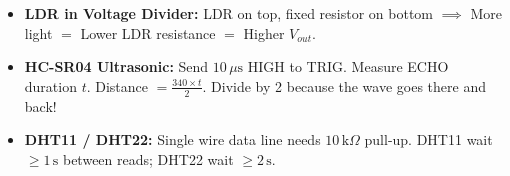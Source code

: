 \begin{trickbox}
\begin{itemize}[leftmargin=*]
    \item \textbf{LDR in Voltage Divider:} LDR on top, fixed resistor on bottom $\implies$ More light $=$ Lower LDR resistance $=$ Higher $V_{out}$.
    \item \textbf{HC-SR04 Ultrasonic:} Send $10\,\mu\text{s}$ HIGH to TRIG. Measure ECHO duration $t$. Distance $= \frac{340 \times t}{2}$. Divide by 2 because the wave goes there and back!
    \item \textbf{DHT11 / DHT22:} Single wire data line needs $10\,\text{k}\Omega$ pull-up. DHT11 wait $\ge 1\,\text{s}$ between reads; DHT22 wait $\ge 2\,\text{s}$.
\end{itemize}
\end{trickbox}
